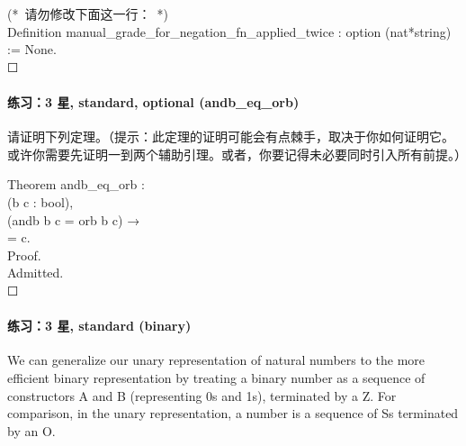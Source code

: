 \documentclass[utf8]{ctexart}
\let\oldparagraph\paragraph
\renewcommand{\paragraph}[1]{\oldparagraph{#1}\mbox{}}
\begin{document}
{(*~请勿修改下面这一行：~*)}\\
{Definition} {manual\_grade\_for\_negation\_fn\_applied\_twice} :
{option} ({nat}*{string}) := {None}.\\

{☐}

\protect\hypertarget{lab46}{}{}

\hypertarget{ux7ec3ux4e603-ux661f-standard-optional-andb_eq_orb}{%
\paragraph{练习：3 星, standard, optional
(andb\_eq\_orb)}\label{ux7ec3ux4e603-ux661f-standard-optional-andb_eq_orb}}

请证明下列定理。（提示：此定理的证明可能会有点棘手，取决于你如何证明它。
或许你需要先证明一到两个辅助引理。或者，你要记得未必要同时引入所有前提。）

{Theorem} {andb\_eq\_orb} :\\
\hspace*{0.333em}\hspace*{0.333em}{∀}({b} {c} : {bool}),\\
\hspace*{0.333em}\hspace*{0.333em}({andb} {b} {c} = {orb} {b} {c}) →\\
\hspace*{0.333em}\hspace*{0.333em}{b} = {c}.\\
{Proof}.\\
\hspace*{0.333em}\hspace*{0.333em}{(*~请在此处解答~*)} {Admitted}.\\

{☐}

\protect\hypertarget{lab47}{}{}

\hypertarget{ux7ec3ux4e603-ux661f-standard-binary}{%
\paragraph{练习：3 星, standard
(binary)}\label{ux7ec3ux4e603-ux661f-standard-binary}}

We can generalize our unary representation of natural numbers to the
more efficient binary representation by treating a binary number as a
sequence of constructors {{A}} and {{B}} (representing 0s and 1s),
terminated by a {{Z}}. For comparison, in the unary representation, a
number is a sequence of {{S}}s terminated by an {{O}}.
\end{document}
